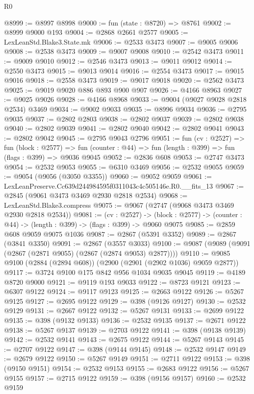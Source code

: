 \begin{lexlean}{R0}
\begin{coremodule}
@8999 := @8997 @8998
@9000 := fun (state : @8720) => @8761
@9002 := @8999 @9000 @193
@9004 := @2868 @2661 @2577
@9005 := LexLeanStd.Blake3.State.mk
@9006 := @2533 @3473
@9007 := @9005 @9006
@9008 := @2538 @3473
@9009 := @9007 @9008
@9010 := @2542 @3473
@9011 := @9009 @9010
@9012 := @2546 @3473
@9013 := @9011 @9012
@9014 := @2550 @3473
@9015 := @9013 @9014
@9016 := @2554 @3473
@9017 := @9015 @9016
@9018 := @2558 @3473
@9019 := @9017 @9018
@9020 := @2562 @3473
@9025 := @9019 @9020 @886 @893 @900 @907
@9026 := @4166 @8963
@9027 := @9025 @9026
@9028 := @4166 @8968
@9033 := @9004 (@9027 @9028 @2818 @2534) @3469
@9034 := @9002 @9033
@9035 := @8996 @9034
@9036 := @2795 @9035
@9037 := @2802 @2803
@9038 := @2802 @9037
@9039 := @2802 @9038
@9040 := @2802 @9039
@9041 := @2802 @9040
@9042 := @2802 @9041
@9043 := @2802 @9042
@9045 := @2795 @9043 @2796
@9051 := fun (cv : @2527) =>
  fun (block : @2577) =>
  fun (counter : @44) => fun (length : @399) => fun (flags : @399) => @9036 @9045
@9052 := @2836 @608
@9053 := @2747 @3473
@9054 := @2532 @9053
@9055 := @6310 @3469
@9056 := @2532 @9055
@9059 := @9054 (@9056 (@3050 @3355))
@9060 := @9052 @9059
@9061 := LexLeanPreserve.Cc639d244984595f0311043c4c505146e.R0.__fits_13
@9067 := @2845 (@9061 @3473 @3469 @2930 @2818 @2534)
@9068 := LexLeanStd.Blake3.compress
@9075 := @9067 (@2747 (@9068 @3473 @3469 @2930 @2818 @2534))
@9081 := (cv : @2527) ->
  (block : @2577) -> (counter : @44) -> (length : @399) -> (flags : @399) -> @9060 @9075
@9085 := @2859 @608 @9059 @9075 @1036
@9087 := @2867 (@5391 @3352)
@9089 := @2867 (@3841 @3350)
@9091 := @2867 (@3557 @3033)
@9100 := @9087 (@9089 (@9091 (@2867 (@2871 @9055) (@2867 (@2874 @9053) @2877))))
@9110 := @9085 @9100 (@2884 (@2894 @608)) (@2900 (@2901 (@2902 @1036) @9059 @2877))
@9117 := @3724 @9100 @175 @842 @956 @1034 @9035 @9045
@9119 := @4189 @8720 @9000
@9121 := @9119 @193 @9033
@9122 := @8723 @9121
@9123 := @6307 @9122
@9124 := @9117 @9123
@9125 := @2663 @9122
@9126 := @5267 @9125
@9127 := @2695 @9122
@9129 := @398 (@9126 @9127)
@9130 := @2532 @9129
@9131 := @2667 @9122
@9132 := @5267 @9131
@9133 := @2699 @9122
@9135 := @398 (@9132 @9133)
@9136 := @2532 @9135
@9137 := @2671 @9122
@9138 := @5267 @9137
@9139 := @2703 @9122
@9141 := @398 (@9138 @9139)
@9142 := @2532 @9141
@9143 := @2675 @9122
@9144 := @5267 @9143
@9145 := @2707 @9122
@9147 := @398 (@9144 @9145)
@9148 := @2532 @9147
@9149 := @2679 @9122
@9150 := @5267 @9149
@9151 := @2711 @9122
@9153 := @398 (@9150 @9151)
@9154 := @2532 @9153
@9155 := @2683 @9122
@9156 := @5267 @9155
@9157 := @2715 @9122
@9159 := @398 (@9156 @9157)
@9160 := @2532 @9159

\end{coremodule}
\end{lexlean}
